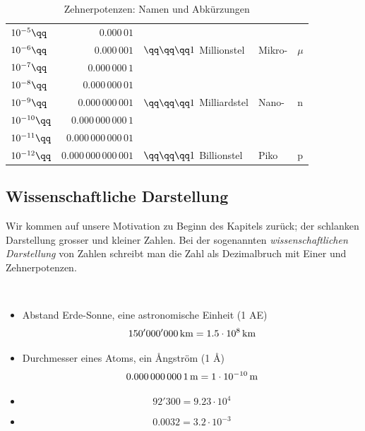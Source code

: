 \documentclass[%
11pt,%
twoside,%
titlepage,%
german,%
]{scrartcl}
\begin{document}
\begin{table}
\begin{center}
{\begin{tabular}[ht]{lrlll}
    \rule[-3mm]{0mm}{24pt}
    $10^{-5}\qq$ & $0.000\,01$ &  &  & \\
    \rule[-3mm]{0mm}{24pt}
    $10^{-6}\qq$ & $0.000\,001$ & $\qq\qq\qq1$ Millionstel & \hspace*{1cm}Mikro- & $\mu$\\
    \rule[-3mm]{0mm}{24pt}
    $10^{-7}\qq$ & $0.000\,000\,1$ &  &  & \\
    \rule[-3mm]{0mm}{24pt}
    $10^{-8}\qq$ & $0.000\,000\,01$ &  &  & \\
    \rule[-3mm]{0mm}{24pt}
    $10^{-9}\qq$ & $0.000\,000\,001$ & $\qq\qq\qq1$ Milliardstel & \hspace*{1cm}Nano- & n\\
    \rule[-3mm]{0mm}{24pt}
    $10^{-10}\qq$ & $0.000\,000\,000\,1$ &  &  & \\
    \rule[-3mm]{0mm}{24pt}
    $10^{-11}\qq$ & $0.000\,000\,000\,01$ &  &  & \\
    \rule[-3mm]{0mm}{24pt}
    $10^{-12}\qq$ & $0.000\,000\,000\,001$ & $\qq\qq\qq1$ Billionstel & \hspace*{1cm}Piko & p\\
  \end{tabular}
  }
    \end{center}
    \caption{Zehnerpotenzen: Namen und Abk\"urzungen}\label{tab:zehnerpotenzen}
 \end{table}

\subsection{Wissenschaftliche Darstellung}
Wir kommen auf unsere Motivation zu Beginn des Kapitels zur\"uck; der schlanken Darstellung grosser und kleiner Zahlen. Bei der sogenannten \emph{wissenschaftlichen Darstellung} von Zahlen schreibt man die Zahl als Dezimalbruch mit Einer und Zehnerpotenzen.
\begin{bsps}
\ \\[-2ex]
\begin{itemize}
\item Abstand Erde-Sonne, eine astronomische Einheit (1 AE)
$$\unit[150'000'000]{km}=\unit[1.5\cdot10^8]{km}$$
\item Durchmesser eines Atoms, ein \AA ngstr\"om (1 \AA)
$$\unit[0.000\,000\,000\,1]{m}=\unit[1\cdot10^{-10}]{m}$$
\item $$92'300=9.23\cdot10^4$$
\item $$0.0032=3.2\cdot10^{-3}$$
\end{itemize}
\end{bsps}
\end{document}

